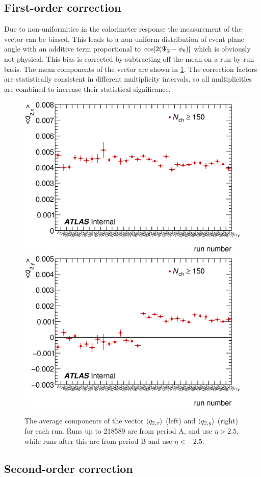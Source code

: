 \subsection{First-order correction}
Due to non-uniformities in the calorimeter response the measurement of the \qt vector can be biased.
This leads to a non-uniform distribution of event plane angle \psit with an additive term proportional to $\cos [2(\Psi_{2} - \phi_0)]$ which is obviously not physical.
This bias is corrected by subtracting off the mean \qt on a run-by-run basis.
The mean components of the \qt vector are shown in \cref{fig:mean_q2}.
The correction factors are statistically consistent in different multiplicity intervals, so all multiplicities are combined to increase their statistical significance.

\begin{figure}[t]
\centering
\includegraphics[width=.49\linewidth]{can_qx.eps}
\includegraphics[width=.49\linewidth]{can_qy.eps}
\caption{The average components of the \qt vector $\langle q_{2,x}\rangle$ (left) and $\langle q_{2,y}\rangle$ (right) for each run. Runs up to 218589 are from period A, and use $\eta > 2.5$, while runs after this are from period B and use $\eta < -2.5$.}
\label{fig:mean_q2}
\end{figure}

\subsection{Second-order correction}

